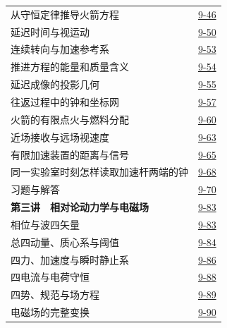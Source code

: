 \begin{longtable}{@{}p{}r@{}}
\hspace{1em}从守恒定律推导火箭方程&\href{course-page:9:50}{9-46}\\[2pt]
\hspace{1em}延迟时间与视运动&\href{course-page:9:54}{9-50}\\[2pt]
\hspace{1em}连续转向与加速参考系&\href{course-page:9:57}{9-53}\\[2pt]
\hspace{1em}推进方程的能量和质量含义&\href{course-page:9:58}{9-54}\\[2pt]
\hspace{1em}延迟成像的投影几何&\href{course-page:9:59}{9-55}\\[2pt]
\hspace{1em}往返过程中的钟和坐标网&\href{course-page:9:61}{9-57}\\[2pt]
\hspace{1em}火箭的有限点火与燃料分配&\href{course-page:9:64}{9-60}\\[2pt]
\hspace{1em}近场接收与远场视速度&\href{course-page:9:67}{9-63}\\[2pt]
\hspace{1em}有限加速装置的距离与信号&\href{course-page:9:69}{9-65}\\[2pt]
\hspace{1em}同一实验室时刻怎样读取加速杆两端的钟&\href{course-page:9:72}{9-68}\\[2pt]
\hspace{1em}习题与解答&\href{course-page:9:74}{9-70}\\[2pt]
\textbf{第三讲　相对论动力学与电磁场}&\href{course-page:9:87}{9-83}\\[2pt]
\hspace{1em}相位与波四矢量&\href{course-page:9:87}{9-83}\\[2pt]
\hspace{1em}总四动量、质心系与阈值&\href{course-page:9:88}{9-84}\\[2pt]
\hspace{1em}四力、加速度与瞬时静止系&\href{course-page:9:90}{9-86}\\[2pt]
\hspace{1em}四电流与电荷守恒&\href{course-page:9:92}{9-88}\\[2pt]
\hspace{1em}四势、规范与场方程&\href{course-page:9:93}{9-89}\\[2pt]
\hspace{1em}电磁场的完整变换&\href{course-page:9:94}{9-90}\\[2pt]

\end{longtable}
